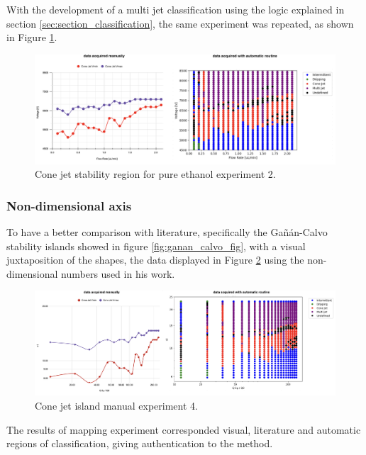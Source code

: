     With the development of a multi jet classification using the logic explained in section \ref{sec:section_classification}, the same experiment was repeated, as shown in Figure \ref{fig:stability_6}.


        \begin{figure}[H]
            \center
            \includegraphics[width=18cm]{Figuras/april/map_third.png}
            \caption{Cone jet stability region for pure ethanol experiment 2.}
            \label{fig:stability_6}
        \end{figure}


    \subsubsection{Non-dimensional axis}

    To have a better comparison with literature, specifically the Gañán-Calvo\cite{gananCalvo} stability islands showed in figure \ref{fig:ganan_calvo_fig}, with a visual juxtaposition of the shapes, the data displayed in Figure \ref{fig:stability_8} using the non-dimensional numbers used in his work\cite{gananCalvo}.

        \begin{figure}[H]
            \center
            \includegraphics[width=18cm]{Figuras/april/manual_au_1.png}
            \caption{Cone jet island manual experiment 4.}
            \label{fig:stability_8}
        \end{figure}

    The results of mapping experiment corresponded visual, literature and automatic regions of classification, giving authentication to the method.


